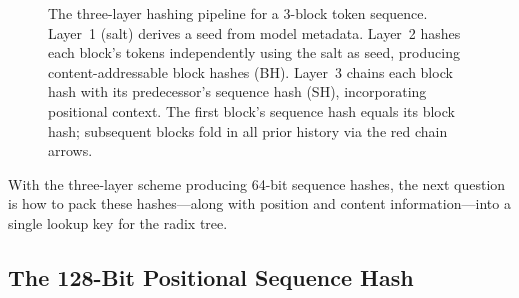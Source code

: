 \begin{figure}[h]
\caption{The three-layer hashing pipeline for a 3-block token sequence. Layer~1 (salt) derives a seed from model metadata. Layer~2 hashes each block's tokens independently using the salt as seed, producing content-addressable block hashes (BH). Layer~3 chains each block hash with its predecessor's sequence hash (SH), incorporating positional context. The first block's sequence hash equals its block hash; subsequent blocks fold in all prior history via the red chain arrows.}
\label{fig:hash-pipeline}
\end{figure}

\medskip
With the three-layer scheme producing 64-bit sequence hashes, the next question is how to pack these hashes---along with position and content information---into a single lookup key for the radix tree.

\subsection{The 128-Bit Positional Sequence Hash}

